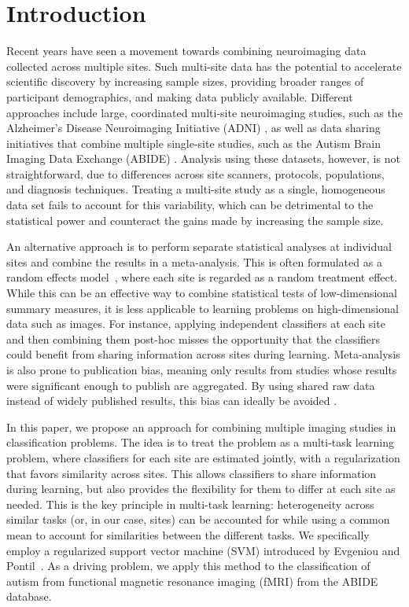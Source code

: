 \documentclass{llncs}
\begin{document}
\section{Introduction}
Recent years have seen a movement towards combining neuroimaging data collected
across multiple sites. Such multi-site data has the potential to accelerate
scientific discovery by increasing sample sizes, providing broader ranges of
participant demographics, and making data publicly available. Different
approaches include large, coordinated multi-site neuroimaging studies, such as
the Alzheimer's Disease Neuroimaging Initiative (ADNI) \cite{adni}, as well as
data sharing initiatives that combine multiple single-site studies, such as the
Autism Brain Imaging Data Exchange (ABIDE) \cite{abide}. Analysis using these
datasets, however, is not straightforward, due to differences across site
scanners, protocols, populations, and diagnosis techniques. Treating a
multi-site study as a single, homogeneous data set fails to account for this
variability, which can be detrimental to the statistical power and counteract
the gains made by increasing the sample size.

An alternative approach is to perform separate statistical analyses at
individual sites and combine the results in a meta-analysis. This is often
formulated as a random effects model~\cite{DerSimonian}, where each site is
regarded as a random treatment effect. While this can be an effective way to
combine statistical tests of low-dimensional summary measures, it is less
applicable to learning problems on high-dimensional data such as images. For
instance, applying independent classifiers at each site and then combining them
post-hoc misses the opportunity that the classifiers could benefit from sharing
information across sites during learning.  Meta-analysis is also prone to publication bias, meaning only results from
studies whose results were significant enough to publish are aggregated.  By using shared raw data instead of widely
published results, this bias can ideally be avoided \cite{meta}.

In this paper, we propose an approach for combining multiple imaging studies in
classification problems. The idea is to treat the problem as a multi-task
learning problem, where classifiers for each site are estimated jointly, with a
regularization that favors similarity across sites. This allows classifiers to
share information during learning, but also provides the flexibility for them to
differ at each site as needed. This is the key principle in multi-task learning:
heterogeneity across similar tasks (or, in our case, sites) can be accounted for
while using a common mean to account for similarities between the different
tasks. We specifically employ a regularized support vector machine (SVM)
introduced by Evgeniou and Pontil~\cite{regMTL}. As a driving problem, we
apply this method to the classification of autism from functional magnetic
resonance imaging (fMRI) from the ABIDE database.
\end{document}

